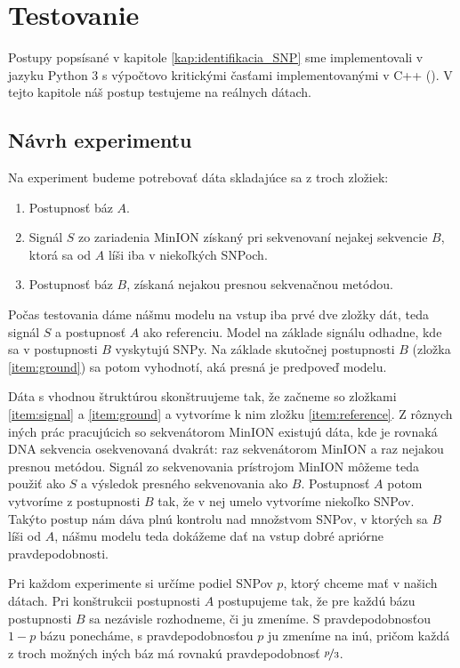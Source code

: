\chapter{Testovanie}

\label{kap:testovanie}

Postupy popsísané v kapitole \ref{kap:identifikacia_SNP} sme implementovali v jazyku Python 3 s
výpočtovo kritickými časťami implementovanými v C++ ().
V tejto kapitole náš postup testujeme na reálnych dátach.


\section{Návrh experimentu}

Na experiment budeme potrebovať dáta skladajúce sa z troch zložiek:

\begin{enumerate}
\item \label{item:reference} Postupnosť báz $A$.
\item \label{item:signal} Signál $S$ zo zariadenia MinION získaný pri sekvenovaní nejakej sekvencie $B$, 
ktorá sa od $A$ líši iba v niekoľkých SNPoch.
\item \label{item:ground} Postupnosť báz $B$, získaná nejakou presnou sekvenačnou metódou.
\end{enumerate}

Počas testovania dáme nášmu modelu na vstup iba prvé dve zložky dát, teda signál $S$ a postupnosť $A$ 
ako referenciu. Model na základe signálu odhadne, kde sa v postupnosti $B$ vyskytujú SNPy. Na základe
skutočnej postupnosti $B$ (zložka \ref{item:ground}) sa potom vyhodnotí, aká presná je predpoveď modelu.

Dáta s vhodnou štruktúrou skonštruujeme tak, že začneme so zložkami \ref{item:signal} a 
\ref{item:ground} a vytvoríme k nim zložku \ref{item:reference}. Z rôznych iných prác pracujúcich
so sekvenátorom MinION existujú dáta, kde je rovnaká DNA sekvencia osekvenovaná dvakrát: raz sekvenátorom MinION a raz nejakou 
presnou metódou. Signál zo sekvenovania prístrojom MinION môžeme teda použiť ako $S$ a výsledok presného 
sekvenovania ako $B$. Postupnosť $A$ potom vytvoríme z postupnosti $B$ tak, že v nej umelo vytvoríme
niekoľko SNPov. Takýto postup nám dáva plnú kontrolu nad množstvom SNPov, v ktorých sa $B$ líši od $A$,
nášmu modelu teda dokážeme dať na vstup dobré apriórne pravdepodobnosti.

Pri každom experimente si určíme podiel SNPov $p$, ktorý chceme mať v našich dátach. Pri konštrukcii
postupnosti $A$ postupujeme tak, že pre každú bázu postupnosti $B$ sa nezávisle rozhodneme, či ju
zmeníme. S pravdepodobnosťou $1-p$ bázu ponecháme, s pravdepodobnosťou $p$ ju zmeníme na inú, pričom
každá z troch možných iných báz má rovnakú pravdepodobnosť $\nicefrac{p}{3}$.


